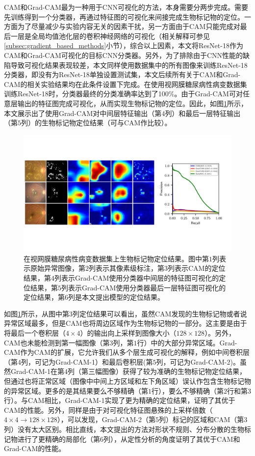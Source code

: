 CAM和Grad-CAM最为一种用于CNN可视化的方法，本身需要分两步完成。需要先训练得到一个分类器，再通过特征图的可视化来间接完成生物标记物的定位。一方面为了尽量减少与实验内容无关的因素干扰，另一方面由于CAM只能完成对最后一层是全局均值池化层的卷积神经网络的可视化（相关解释可参见\ref{subsec:gradient_based_methods}小节），综合以上因素，本文将ResNet-18作为CAM和Grad-CAM可视化的目标CNN分类器。另外，为了排除由于CNN性能的缺陷导致可视化结果表现较差，本文同样使用数据集中的所有图像来训练ResNet-18分类器，即没有为ResNet-18单独设置测试集，本文后续所有关于CAM和Grad-CAM的相关实验结果均在此条件设置下完成。在使用视网膜糖尿病性病变数据集训练ResNet-18时，分类器最终的分类准确率达到了100\%。由于Grad-CAM可对任意层输出的特征图完成可视化，从而实现生物标记物的定位。因此，如图\ref{fig:retinal_image_res}所示，本文展示出了使用Grad-CAM对中间层特征输出（第$4$列）和最后一层特征输出（第$5$列）的生物标记物定位结果（可与CAM作比较）。
\begin{figure}[h]
	\centering
	\includegraphics[width=1.0\textwidth]{figure/retinal_image_res.pdf}
	\caption{在视网膜糖尿病性病变数据集上生物标记物定位结果。图中第$1$列表示原始异常图像，第$2$列表示其像素级标注，第$3$列表示CAM的定位结果，第$4$列表示Grad-CAM使用分类器中间层的特征图可视化的定位结果，第$5$列表示Grad-CAM使用分类器最后一层特征图可视化的定位结果，第$6$列是本文提出模型的定位结果。}
	\label{fig:retinal_image_res}
\end{figure}

\noindent 如图\ref{fig:retinal_image_res}所示，从图中第$3$列定位结果可以看出，虽然CAM发现的生物标记物或者说异常区域最多，但是CAM也将周边区域作为生物标记物的一部分。这主要是由于将最后一个卷积层（$4\times 4$）的输出向上采样到图像大小（$128\times 128$）。另外，CAM也未能检测到第一幅图像（第$3$列，第$1$行）中的大部分异常区域。Grad-CAM作为CAM的扩展，它允许我们从多个层生成可视化的解释，例如中间卷积层（第$4$列，可记为Grad-CAM-1）和最后卷积层(第$5$列，可记为Grad-CAM-2)。虽然Grad-CAM-1在第$4$列（第三幅图像）获得了较为准确的生物标记物定位结果，但通过也将正常区域（图像中中间上方区域和左下角区域）误认作包含生物标记物的异常区域。更多的是其结果要么不够精确（第$1$行），要么不够精确（第$2$行和第$3$行）。与CAM相比，Grad-CAM-1实现了更为精确的定位结果，证明了其优于CAM的性能。另外，同样是由于对可视化特征图悬殊的上采样倍数（$4\times 4 \rightarrow 128\times 128$），可以发现，Grad-CAM-2（第$5$列）标记的区域和CAM（第$3$列）没有太大区别。相比直线，本文提出的方法对形状不规则、分布分散的生物标记物进行了更精确的局部化（第$6$列），从定性分析的角度证明了其优于CAM和Grad-CAM的性能。

